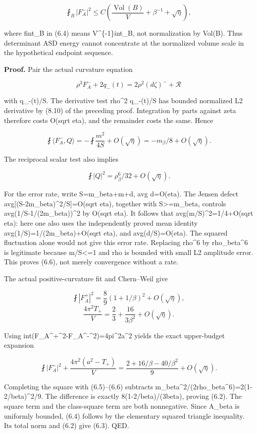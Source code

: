 \documentclass[
  10pt,
]{article}
\begin{document}
\[
 \fint_B|F_A^-|^2\le
 C\left(\frac{\operatorname{Vol}(B)}V+\beta^{-1}
                                      +\sqrt\eta\right),        \tag{6.4}
\]

where fint\_B in (6.4) means V\^{}\{-1\}int\_B, not normalization by
Vol(B). Thus determinant ASD energy cannot concentrate at the normalized
volume scale in the hypothetical endpoint sequence.

\textbf{Proof.} Pair the actual curvature equation

\[
 \rho^3F_A^-+2q_-(t)=2\rho^2(d\zeta)^-+\mathcal R
\]

with q\_-(t)/S. The derivative test rho\^{}2 q\_-(t)/S has bounded
normalized L2 derivative by (8.10) of the preceding proof. Integration
by parts against zeta therefore costs O(sqrt eta), and the remainder
costs the same. Hence

\[
 \fint\langle F_A^-,Q\rangle
     =-\fint\frac{m^2}{4S}+O(\sqrt\eta)
     =-m_\beta/8+O(\sqrt\eta).                         \tag{6.5}
\]

The reciprocal scalar test also implies

\[
 \fint |Q|^2=\rho_\beta^6/32+O(\sqrt\eta).             \tag{6.6}
\]

For the error rate, write S=m\_beta+m+d, avg d=O(eta). The Jensen defect
avg{[}(S-2m\_beta)\^{}2/S{]}=O(sqrt eta), together with
S\textgreater=m\_beta, controls avg(1/S-1/(2m\_beta))\^{}2 by O(sqrt
eta). It follows that avg(m/S)\^{}2=1/4+O(sqrt eta): here one also uses
the independently proved mean identity avg(1/S)=1/(2m\_beta)+O(sqrt
eta), and avg(d/S)=O(eta). The squared fluctuation alone would not give
this error rate. Replacing rho\^{}6 by rho\_beta\^{}6 is legitimate
because m/S\textless=1 and rho is bounded with small L2 amplitude error.
This proves (6.6), not merely convergence without a rate.

The actual positive-curvature fit and Chern--Weil give

\[
 \fint|F_A^+|^2=\frac89(1+1/\beta)^2+O(\sqrt\eta),
\] \[
 \frac{4\pi^2T_+}V=\frac23+\frac{16}{3\beta^2}
                                         +O(\sqrt\eta).
\]

Using
int(\textbar F\_A\^{}+\textbar\^{}2-\textbar F\_A\^{}-\textbar\^{}2)=4pi\^{}2a\^{}2
yields the exact upper-budget expansion

\[
 \fint|F_A^-|^2+\frac{4\pi^2(a^2-T_+)}V
 =\frac{2+16/\beta-40/\beta^2}{9}+O(\sqrt\eta).          \tag{6.7}
\]

Completing the square with (6.5)--(6.6) subtracts
m\_beta\^{}2/(2rho\_beta\^{}6)=2(1-2/beta)\^{}2/9. The difference is
exactly 8(1-2/beta)/(3beta), proving (6.2). The square term and the
class-square term are both nonnegative. Since A\_beta is uniformly
bounded, (6.4) follows by the elementary squared triangle inequality.
Its total norm and (6.2) give (6.3). QED.
\end{document}
